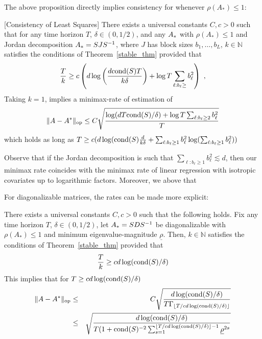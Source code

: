 The above proposition directly implies consistency for whenever $\rho(A_*) \le 1$:
\begin{cor}\label{cor:consistent}[Consistency of Least Squares] There exists a universal constants $C,c > 0$ such that for any time horizon $T$, $\delta \in (0,1/2)$, and any $A_{*}$ with $\rho(A_*) \le 1$ and Jordan decomposition $A_{*} = SJS^{-1}$, where $J$ has block sizes $b_{1},\dots,b_L$, $k \in \mathbb{N}$ satisfies the conditions of Theorem~\ref{stable_thm} provided that
\begin{eqnarray}\label{eq:T_over_K_jordan}
\frac{T}{k} \ge c\left( d \log \left(\frac{d\mathrm{cond}(S)T}{k \delta }\right) + \log T \sum_{\ell: b_{\ell} \ge } b_{\ell}^2  \right)~,
\end{eqnarray}
Taking $k =1$, implies a minimax-rate of estimation of 
\begin{eqnarray}\label{eq:minmax_rate}
\|A - A^*\|_{\mathrm{op}} \le C\sqrt{ \frac{  \log (dT\mathrm{cond}(S)/\delta) + \log T \sum_{\ell: b_{\ell} \ge 2} b_{\ell}^2 }{T}}
\end{eqnarray}
which holds as long as $T \ge c(d \log (\mathrm{cond}(S)\frac{d}{k \delta } + \sum_{\ell: b_{\ell} \ge 1} b_{\ell}^2 \log (\sum_{\ell: b_{\ell} \ge 1} b_{\ell}^2))$
\end{cor}
\begin{rem}\label{rem:consistent} Observe that if the Jordan decomposition is such that $\sum_{\ell: b_{\ell} \ge 1} b_{\ell}^2 \lesssim d$, then our minimax rate coincides with the minimax rate of linear regression with isotropic covariates up to logarithmic factors. Moreover, we above that 
\end{rem}
For diagonalizable matrices, the rates can be made more explicit:
\begin{cor}\label{cor:diag}
There exists a universal constants $C,c > 0$ such that the following holds. Fix any time horizon $T$, $\delta \in (0,1/2)$, let $A_{*} =  SDS^{-1}$ be diagonalizable with $\rho(A_*) \le 1$ and minimum eigenvalue-magnitude $\underline{\rho}$. Then,  $k \in \mathbb{N}$ satisfies the conditions of Theorem~\ref{stable_thm} provided that
\begin{eqnarray}\label{eq:T_over_K_diag}
\frac{T}{k} \ge c d \log (\mathrm{cond}(S)/\delta) 
\end{eqnarray}
This implies that for $T \ge c d \log (\mathrm{cond}(S)/\delta)$
\begin{eqnarray}
\|A - A^*\|_{\mathrm{op}} &\le& C\sqrt{ \frac{ d \log (\mathrm{cond}(S)/\delta)  }{T \Gamma_{\lfloor T/c d \log (\mathrm{cond}(S)/\delta)\rfloor}}} \label{eq:gamma_diag_bound}\\
&\le& \sqrt{ \frac{d \log (\mathrm{cond}(S)/\delta)  }{T (1 + \mathrm{cond}(S)^{-2}\sum_{s=1}^{\lfloor T/c d \log (\mathrm{cond}(S)/\delta)\rfloor-1 } \underline{\rho}^{2s}  }} \label{eq:no_gamma_diag_bound}
\end{eqnarray}
\end{cor}


